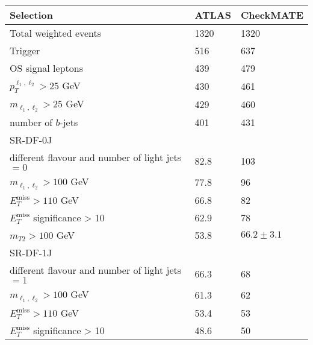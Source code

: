 \documentclass[10pt,fleqn]{article}
\begin{document}
\begin{enumerate}
\begin{table}[h!] \centering 
 \renewcommand*{\arraystretch}{1.2}
 \begin{tabular}{l|p{1.5cm}|p{1.5cm}} \toprule
  Selection                                                                       & ATLAS    & CheckMATE       \\ \midrule
  Total weighted events                                                           &  1320    &   1320      \\
  Trigger                                                                         &   516    &   637\\
  OS signal leptons                                                               &   439    &   479\\
  $p_T^{\ell_1,\ell_2} > 25$ GeV                                                  &   430    &   461\\
  $m_{\ell_1,\ell_2} > 25  $ GeV                                                  &   429    &   460\\
  number of $b$-jets                                                              &   401    &   431\\   \midrule
  SR-DF-0J  & &\\ \midrule
  different flavour and number of light jets $=0$                                 &  82.8    &   103\\
  $m_{\ell_1,\ell_2} > 100  $ GeV                                                 &  77.8    &    96\\
  $E_T^\mathrm{miss} > 110$ GeV                                                   &  66.8    &    82\\
  $E_T^\mathrm{miss}$ significance > 10                                           &  62.9    &    78\\
  $m_{T2} >  100$ GeV                                                             &  53.8    &    $66.2\pm 3.1$\\ \midrule   
  SR-DF-1J  & &\\ \midrule
  different flavour and number of light jets $=1$                                 &  66.3    &    68\\
  $m_{\ell_1,\ell_2} > 100  $ GeV                                                 &  61.3    &    62\\
  $E_T^\mathrm{miss} > 110$ GeV                                                   &  53.4    &    53\\
  $E_T^\mathrm{miss}$ significance > 10                                           &  48.6    &    50\\

\end{tabular}
\end{table}
\end{enumerate}
\end{document}
